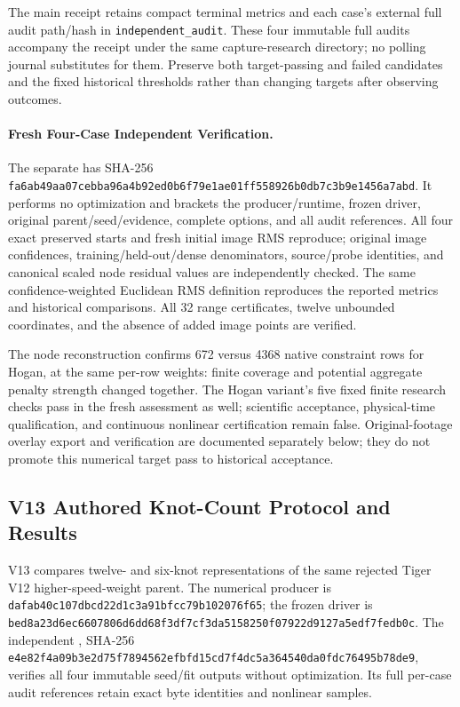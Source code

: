 \documentclass[11pt,letterpaper]{article}
\newcommand{\code}[1]{\nolinkurl{#1}}
\newcommand{\hash}[1]{{\footnotesize\nolinkurl{#1}}}
\begin{document}
The main receipt retains compact terminal metrics and each case's external
full audit path/hash in \code{independent_audit}. These four immutable full
audits accompany the receipt under the same capture-research directory;
no polling journal substitutes for them. Preserve both target-passing and
failed candidates and the fixed historical thresholds rather than changing
targets after observing outcomes.

\paragraph{Fresh Four-Case Independent Verification.}
The separate  has SHA-256
\hash{fa6ab49aa07cebba96a4b92ed0b6f79e1ae01ff558926b0db7c3b9e1456a7abd}.
It performs no optimization and brackets the producer/runtime, frozen driver,
original parent/seed/evidence, complete options, and all audit references.
All four exact preserved starts and fresh initial image RMS reproduce; original
image confidences, training/held-out/dense denominators, source/probe identities,
and canonical scaled node residual values are independently checked.
The same confidence-weighted Euclidean RMS definition reproduces the reported
metrics and historical comparisons. All 32 range certificates, twelve
unbounded coordinates, and the absence of added image points are verified.

The node reconstruction confirms 672 versus 4368 native constraint rows for
Hogan, at the same per-row weights: finite coverage and potential aggregate
penalty strength changed together. The Hogan variant's five fixed finite
research checks pass in the fresh assessment as well; scientific acceptance,
physical-time qualification, and continuous nonlinear certification remain
false. Original-footage overlay export and verification are documented
separately below; they do not promote this numerical target pass to
historical acceptance.

\subsection{V13 Authored Knot-Count Protocol and Results}
V13 compares twelve- and six-knot representations of the same rejected Tiger
V12 higher-speed-weight parent. The numerical producer is
\hash{dafab40c107dbcd22d1c3a91bfcc79b102076f65}; the frozen driver is
\hash{bed8a23d6ec6607806d6dd68f3df7cf3da5158250f07922d9127a5edf7fedb0c}.
The independent , SHA-256
\hash{e4e82f4a09b3e2d75f7894562efbfd15cd7f4dc5a364540da0fdc76495b78de9},
verifies all four immutable seed/fit outputs without optimization. Its full
per-case audit references retain exact byte identities and nonlinear samples.
\end{document}
